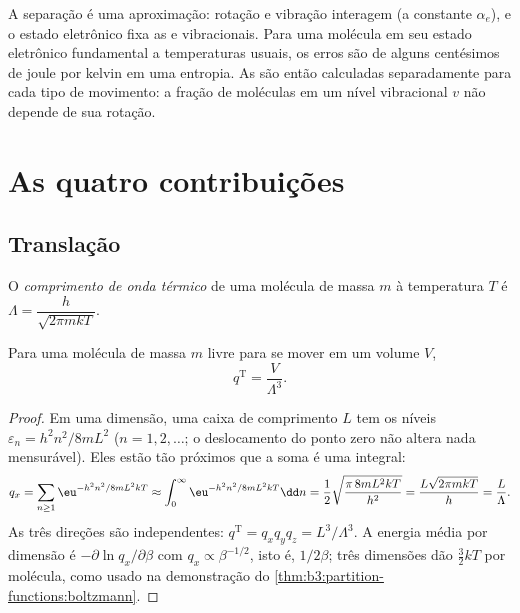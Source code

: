 A separação é uma aproximação: rotação e vibração interagem (a constante
$\alpha_e$), e o estado eletrônico fixa as  e
vibracionais. Para uma molécula em seu estado eletrônico fundamental a
temperaturas usuais, os erros são de alguns centésimos de joule por kelvin em
uma entropia. As  são então calculadas separadamente para cada tipo
de movimento: a fração de moléculas em um nível vibracional $v$ não depende de
sua rotação.

\section{As quatro contribuições}

\subsection*{Translação}

\begin{definition}\label{def:b3:partition-functions:thermal-wavelength}
O \emph{comprimento de onda térmico} de uma molécula de massa $m$
à temperatura $T$ é $\Lambda = \dfrac{h}{\sqrt{2\pi mkT}}$.
\end{definition}

\begin{proposition}\label{prop:b3:partition-functions:q-trans}
Para uma molécula de massa $m$ livre para se mover em um volume $V$,
\[
  q^{\mathrm T} = \frac{V}{\Lambda^3}.
\]
\end{proposition}

\begin{proof}
Em uma dimensão, uma caixa de comprimento $L$ tem os níveis $\varepsilon_n = h^2n^2/8mL^2$
($n = 1, 2, \dots$; o deslocamento do ponto zero não altera nada mensurável). Eles
estão tão próximos que a soma é uma integral:
\[
  q_x = \sum_{n\ge1}\eu^{-h^2n^2/8mL^2kT} \approx \int_0^\infty\eu^{-h^2n^2/8mL^2kT}\dd n
      = \frac12\sqrt{\frac{\pi\,8mL^2kT}{h^2}} = \frac{L\sqrt{2\pi mkT}}{h} = \frac{L}{\Lambda}.
\]
As três direções são independentes: $q^{\mathrm T} = q_xq_yq_z = L^3/\Lambda^3$. A
energia média por dimensão é $-\partial\ln q_x/\partial\beta$ com $q_x \propto \beta^{-1/2}$, isto é,
$1/2\beta$; três dimensões dão $\frac32kT$ por molécula, como usado na demonstração do
\cref{thm:b3:partition-functions:boltzmann}.
\end{proof}

